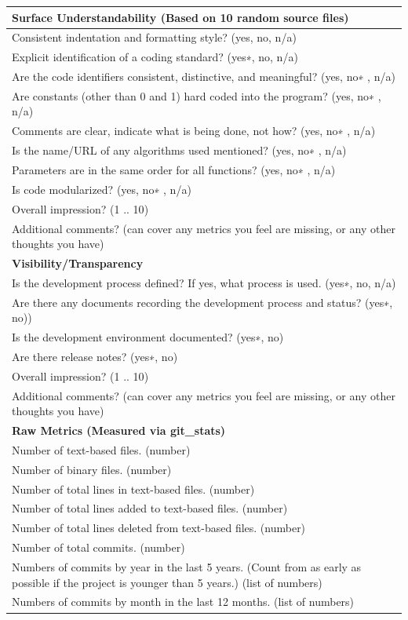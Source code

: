 \documentclass[12pt, notitlepage]{article}
\begin{document}
\begin{appendices}
\begin{singlespace}
\def\arraystretch{1.4}
\begin{tabular}{p{14cm}}
		\hline		
	\textbf{Surface Understandability (Based on 10 random source files)}\\
	\hline
	Consistent indentation and formatting style? ({yes, no, n/a})\\
	Explicit identification of a coding standard? ({yes∗, no, n/a})\\
	Are the code identifiers consistent, distinctive, and meaningful? ({yes, no∗ , n/a})\\
	Are constants (other than 0 and 1) hard coded into the program? ({yes, no∗ , n/a})\\
	Comments are clear, indicate what is being done, not how? ({yes, no∗ , n/a})\\
	Is the name/URL of any algorithms used mentioned? ({yes, no∗ , n/a})\\
	Parameters are in the same order for all functions? ({yes, no∗ , n/a})\\
	Is code modularized? ({yes, no∗ , n/a})\\
	Overall impression? ({1 .. 10})\\
	Additional comments? (can cover any metrics you feel are missing, or any other thoughts you have)\\
	\hline		
	\textbf{Visibility/Transparency}\\
	\hline
	Is the development process defined? If yes, what process is used. ({yes∗, no, n/a})\\
	Are there any documents recording the development process and status?  ({yes∗, no}))\\
	Is the development environment documented? ({yes∗, no})\\
	Are there release notes? ({yes∗, no})\\
	Overall impression? ({1 .. 10})\\
	Additional comments? (can cover any metrics you feel are missing, or any other thoughts you have)\\
		\hline		
	\textbf{Raw Metrics (Measured via git\_stats)}\\
	\hline
	Number of text-based files. (number)\\
	Number of binary files. (number)\\
	Number of total lines in text-based files. (number)\\
	Number of total lines added to text-based files. (number)\\
	Number of total lines deleted from text-based files. (number)\\
	Number of total commits. (number)\\
	Numbers of commits by year in the last 5 years. (Count from as early as possible if the project is younger than 5 years.) (list of numbers)\\
	Numbers of commits by month in the last 12 months. (list of numbers)\\
	\hline
\end{tabular}


\end{singlespace}
\end{appendices}
\end{document}
